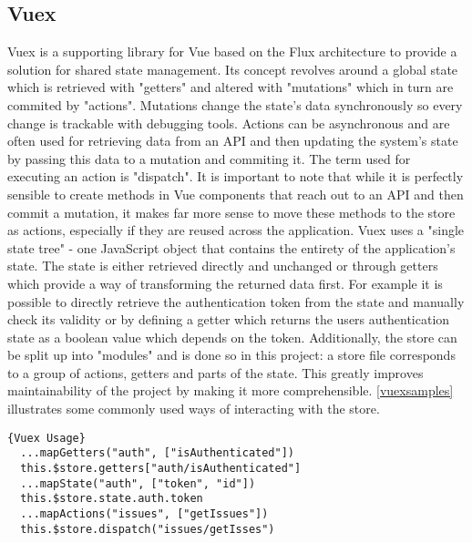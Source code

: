 \subsection{Vuex}
Vuex is a supporting library for Vue based on the Flux architecture to provide a solution for shared state management. Its concept revolves around a global state which is retrieved with "getters" and altered with "mutations" which in turn are commited by "actions". Mutations change the state's data synchronously so every change is trackable with debugging tools. Actions can be asynchronous and are often used for retrieving data from an API and then updating the system's state by passing this data to a mutation and commiting it. The term used for executing an action is "dispatch". It is important to note that while it is perfectly sensible to create methods in Vue components that reach out to an API and then commit a mutation, it makes far more sense to move these methods to the store as actions, especially if they are reused across the application. Vuex uses a "single state tree" - one JavaScript object that contains the entirety of the application's state. The state is either retrieved directly and unchanged or through getters which provide a way of transforming the returned data first. For example it is possible to directly retrieve the authentication token from the state and manually check its validity or by defining a getter which returns the users authentication state as a boolean value which depends on the token. Additionally, the store can be split up into "modules" and is done so in this project: a store file corresponds to a group of actions, getters and parts of the state. This greatly improves maintainability of the project by making it more comprehensible. \autoref{vuexsamples} illustrates some commonly used ways of interacting with the store. \newline

\begin{lstlisting}[caption=Vuex Usage, captionpos=b, style=htmlcssjs, label=vuexsamples]{Vuex Usage}
  ...mapGetters("auth", ["isAuthenticated"])
  this.$store.getters["auth/isAuthenticated"]
  ...mapState("auth", ["token", "id"])
  this.$store.state.auth.token
  ...mapActions("issues", ["getIssues"])
  this.$store.dispatch("issues/getIsses")
\end{lstlisting}

